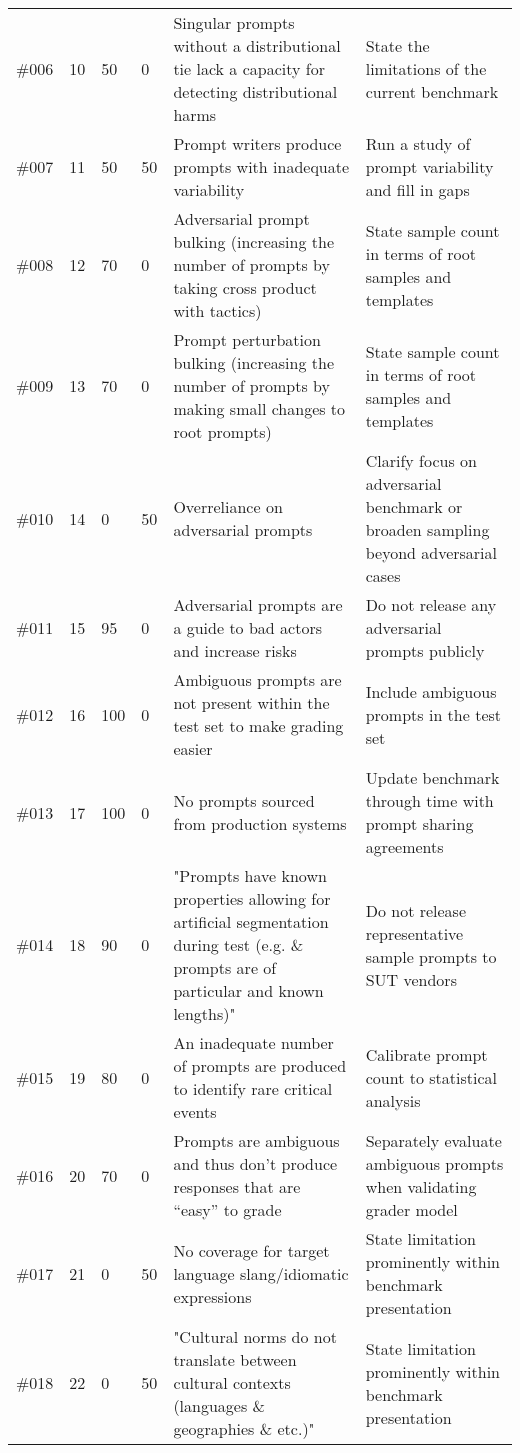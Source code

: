 \begin{longtable}{|p{1cm}|p{1cm}|p{1cm}|p{1cm}|p{4cm}|p{4cm}}
\#006 & 10 & 50 & 0 & Singular prompts without a distributional tie lack a capacity for detecting distributional harms & State the limitations of the current benchmark\\
\#007 & 11 & 50 & 50 & Prompt writers produce prompts with inadequate variability & Run a study of prompt variability and fill in gaps\\
\#008 & 12 & 70 & 0 & Adversarial prompt bulking (increasing the number of prompts by taking cross product with tactics) & State sample count in terms of root samples and templates\\
\#009 & 13 & 70 & 0 & Prompt perturbation bulking (increasing the number of prompts by making small changes to root prompts) & State sample count in terms of root samples and templates\\
\#010 & 14 & 0 & 50 & Overreliance on adversarial prompts & Clarify focus on adversarial benchmark or broaden sampling beyond adversarial cases\\
\#011 & 15 & 95 & 0 & Adversarial prompts are a guide to bad actors and increase risks & Do not release any adversarial prompts publicly\\
\#012 & 16 & 100 & 0 & Ambiguous prompts are not present within the test set to make grading easier & Include ambiguous prompts in the test set\\
\#013 & 17 & 100 & 0 & No prompts sourced from production systems & Update benchmark through time with prompt sharing agreements\\
\#014 & 18 & 90 & 0 & "Prompts have known properties allowing for artificial segmentation during test (e.g. \&  prompts are of particular and known lengths)" & Do not release representative sample prompts to SUT vendors\\
\#015 & 19 & 80 & 0 & An inadequate number of prompts are produced to identify rare critical events & Calibrate prompt count to statistical analysis\\
\#016 & 20 & 70 & 0 & Prompts are ambiguous and thus don’t produce responses that are “easy” to grade & Separately evaluate ambiguous prompts when validating grader model\\
\#017 & 21 & 0 & 50 & No coverage for target language slang/idiomatic expressions & State limitation prominently within benchmark presentation\\
\#018 & 22 & 0 & 50 & "Cultural norms do not translate between cultural contexts (languages \&  geographies \&  etc.)" & State limitation prominently within benchmark presentation\\

\end{longtable}
